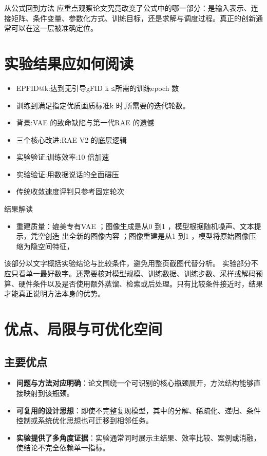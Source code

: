 \documentclass[UTF8,11pt,a4paper]{ctexart}
\newcommand{\term}[1]{\textbf{\textcolor{mainblue}{#1}}}
\begin{document}
\begin{keybox}{从公式回到方法}
应重点观察论文究竟改变了公式中的哪一部分：是输入表示、连接矩阵、条件变量、参数化方式、训练目标，还是求解与调度过程。真正的创新通常可以在这一层被准确定位。
\end{keybox}


\section{实验结果应如何阅读}
\begin{itemize}
\item EPFID@k:达到无引导gFID k ≤所需的训练epoch 数
\item 训练到满足指定优质画质标准k 时,所需要的迭代轮数。
\item 背景:VAE 的致命缺陷与第一代RAE 的遗憾
\item 三个核心改进:RAE V2 的底层逻辑
\item 实验验证:训练效率:10 倍加速
\item 实验验证:用数据说话的全面碾压
\item 传统收敛速度评判只参考固定轮次
\end{itemize}

\begin{notebox}{结果解读}
\begin{itemize}
\item 重建质量：媲美专有VAE ；图像生成是从0 到1 ，模型根据随机噪声、文本提示，凭空创造 出全新的图像内容 ；图像重建是从1 到1 ，模型将原始图像压缩为隐空间特征，
\end{itemize}
\end{notebox}

该部分以文字概括实验结论与比较条件，避免用整页截图代替分析。
实验部分不应只看单一最好数字。还需要核对模型规模、训练数据、训练步数、采样或解码预算、硬件条件以及是否使用额外蒸馏、检索或后处理。只有比较条件接近时，结果才能真正说明方法本身的优势。

\section{优点、局限与可优化空间}
\subsection{主要优点}
\begin{itemize}
\item \term{问题与方法对应明确}：论文围绕一个可识别的核心瓶颈展开，方法结构能够直接映射到该瓶颈。
\item \term{可复用的设计思想}：即使不完整复现模型，其中的分解、稀疏化、递归、条件控制或系统优化思想也可迁移到相邻任务。
\item \term{实验提供了多角度证据}：实验通常同时展示主结果、效率比较、案例或消融，使结论不完全依赖单一指标。
\end{itemize}
\end{document}
